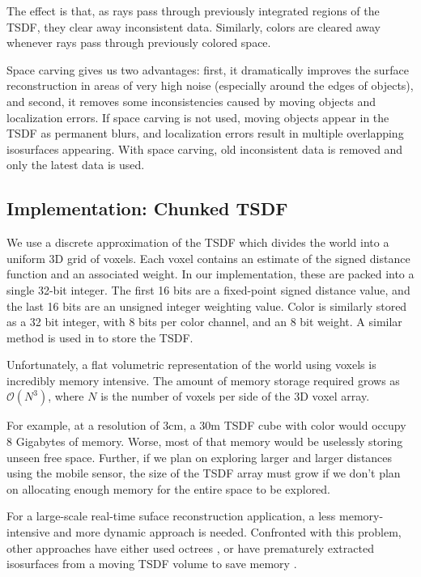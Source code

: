 \noindent  The effect is that, as rays pass through previously integrated
regions of the TSDF, they clear away inconsistent data. Similarly, colors are
cleared away whenever rays pass through previously colored space.

Space carving gives us two advantages: first, it dramatically improves the
surface reconstruction in areas of very high noise (especially around the edges
of objects), and second, it removes some inconsistencies caused by moving
objects and localization errors. If space carving is not used, moving objects
appear in the TSDF as permanent blurs, and localization errors result in
multiple overlapping isosurfaces appearing. With space carving, old inconsistent
data is removed and only the latest data is used.

\subsection{Implementation: Chunked TSDF}
We use a discrete approximation of the TSDF which divides the world into
a uniform 3D grid of voxels. Each voxel contains an estimate of the signed
distance function and an associated weight. In our implementation, these are
packed into a single 32-bit integer. The first 16 bits are a fixed-point
signed distance value, and the last 16 bits  are an unsigned integer weighting
value. Color is similarly stored as a 32 bit integer, with 8 bits per color
channel, and an 8 bit weight. A similar method is used in \cite{Newcombe,
Whelan2013, Bylow2013} to store the TSDF.

Unfortunately, a flat volumetric representation of the world using voxels is
incredibly memory intensive. The amount of memory storage required grows as
$\mathcal{O}(N^3)$, where $N$ is the number of voxels per side of the 3D voxel
array.

For example, at a resolution of $3\text{cm}$,  a $30\text{m}$ TSDF cube with
color would occupy 8 Gigabytes of memory. Worse, most of that memory would be
uselessly storing unseen free space. Further, if we plan on exploring larger and larger
distances using the mobile sensor, the size of the TSDF array must grow if we
don't plan on allocating enough memory for the entire space to be explored.

For a large-scale real-time suface reconstruction application, a less
memory-intensive and more dynamic approach is needed. Confronted with this
problem, other approaches have either used  octrees \cite{Wurm2010}, or have
prematurely extracted isosurfaces from a moving TSDF volume to save memory
\cite{Whelan2013}.

